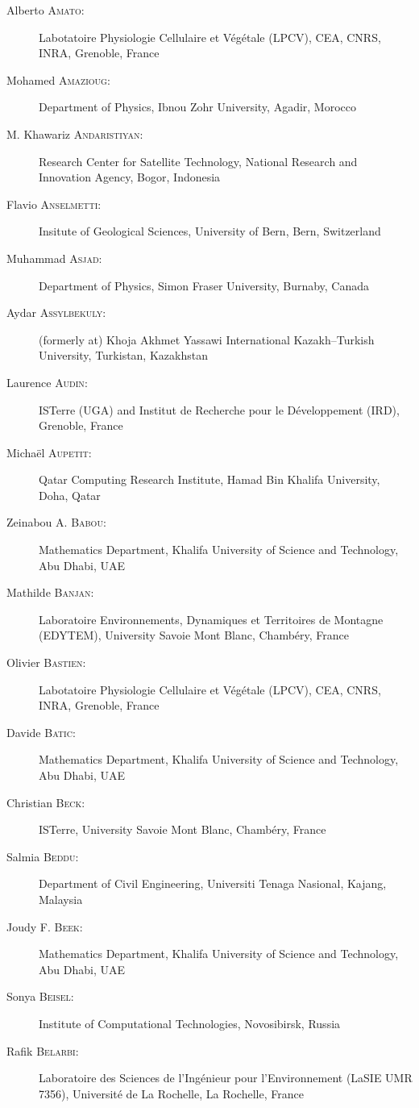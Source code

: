 \begin{description}
  \item[Alberto \textsc{Amato}:] Labotatoire Physiologie Cellulaire et V\'eg\'etale (LPCV), CEA, CNRS, INRA, Grenoble, France
  \item[Mohamed \textsc{Amazioug}:] Department of Physics, Ibnou Zohr University, Agadir, Morocco
  \item[M. Khawariz \textsc{Andaristiyan}:] Research Center for Satellite Technology, National Research and Innovation Agency, Bogor, Indonesia
  \item[Flavio \textsc{Anselmetti}:] Insitute of Geological Sciences, University of Bern, Bern, Switzerland
  \item[Muhammad \textsc{Asjad}:] Department of Physics, Simon Fraser University, Burnaby, Canada
  \item[Aydar \textsc{Assylbekuly}:] (formerly at) Khoja Akhmet Yassawi International Kazakh--Turkish University, Turkistan, Kazakhstan
  \item[Laurence \textsc{Audin}:] ISTerre (UGA) and Institut de Recherche pour le D\'eveloppement (IRD), Grenoble, France
  \item[Micha\"el \textsc{Aupetit}:] Qatar Computing Research Institute, Hamad Bin Khalifa University, Doha, Qatar
  \item[Zeinabou A. \textsc{Babou}:] Mathematics Department, Khalifa University of Science and Technology, Abu Dhabi, UAE
  \item[Mathilde \textsc{Banjan}:] Laboratoire Environnements, Dynamiques et Territoires de Montagne (EDYTEM), University Savoie Mont Blanc, Chamb\'ery, France
  \item[Olivier \textsc{Bastien}:] Labotatoire Physiologie Cellulaire et V\'eg\'etale (LPCV), CEA, CNRS, INRA, Grenoble, France
  \item[Davide \textsc{Batic}:] Mathematics Department, Khalifa University of Science and Technology, Abu Dhabi, UAE
  \item[Christian \textsc{Beck}:] ISTerre, University Savoie Mont Blanc, Chamb\'ery, France
  \item[Salmia \textsc{Beddu}:] Department of Civil Engineering, Universiti Tenaga Nasional, Kajang, Malaysia
  \item[Joudy F. \textsc{Beek}:] Mathematics Department, Khalifa University of Science and Technology, Abu Dhabi, UAE
  \item[Sonya \textsc{Beisel}:] Institute of Computational Technologies, Novosibirsk, Russia
  \item[Rafik \textsc{Belarbi}:] Laboratoire des Sciences de l'Ing\'enieur pour l'Environnement (LaSIE UMR 7356), Universit\'e de La Rochelle, La Rochelle, France

\end{description}
